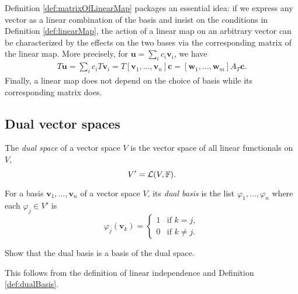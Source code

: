 \begin{rem}
Definition \ref{def:matrixOfLinearMap} 
 packages an essential idea:
 if we express any vector as a linear combination
 of the basis
 and insist on the conditions in Definition \ref{def:linearMap},
 the action of a linear map on an arbitrary vector 
 can be characterized by the effects on the two bases
 via the corresponding matrix of the linear map.
More precisely,
 for $\mathbf{u}=\sum_i c_i\mathbf{v}_i$,
 we have 
 \begin{align*}
   T\mathbf{u} = \sum_i c_iT\mathbf{v}_i = T [\mathbf{v}_1, \ldots, \mathbf{v}_n] \mathbf{c}
   = [\mathbf{w}_1, \ldots, \mathbf{w}_m] A_T \mathbf{c}.
 \end{align*}
 Finally, a linear map does not depend on
 the choice of basis while its corresponding matrix does.
\end{rem}


\subsection{Dual vector spaces}
\label{sec:dual-space}

\begin{defn}
  \label{def:dualSpace}
  The \emph{dual space} of a vector space $V$
   is the vector space of all linear functionals on $V$,
   \begin{equation}
     \label{eq:dualSpace}
     V'={\cal L}(V,\mathbb{F}).
   \end{equation}
\end{defn}

\begin{defn}
  \label{def:dualBasis}
  For a basis $\mathbf{v}_1,\ldots, \mathbf{v}_n$ of a vector space $V$,
   its \emph{dual basis}
   is the list $\varphi_1, \ldots, \varphi_n$
   where each $\varphi_j\in V'$ is
   \begin{equation}
     \label{eq:dualBasis}
     \varphi_j(\mathbf{v}_k) = 
     \begin{cases}
       1 & \textrm{if } k=j,
       \\
       0 & \textrm{if } k\ne j.
     \end{cases}
   \end{equation}
\end{defn}

\begin{exc}
  \label{exc:basicChainsCochainsAreBasis}
  Show that the dual basis is a basis of the dual space.
\end{exc}
\begin{solution}
  This follows from the definition of linear independence
   and Definition \ref{def:dualBasis}.
\end{solution}
 
